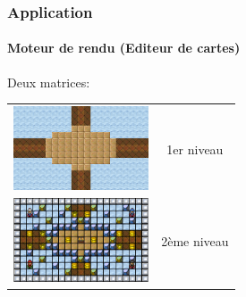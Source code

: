	\begin{frame}
		\frametitle{Application}
		\framesubtitle{Moteur de rendu (Editeur de cartes)}		
		
		Deux matrices:
		\begin{center}
			\begin{tabular}{cc}
				\includegraphics[width=4cm]{./img/img10.png} & 1er niveau \\
				\includegraphics[width=4cm]{./img/img9.png} & 2ème niveau \\
			\end{tabular}
		\end{center}
	\end{frame}
	
	
%		
	
